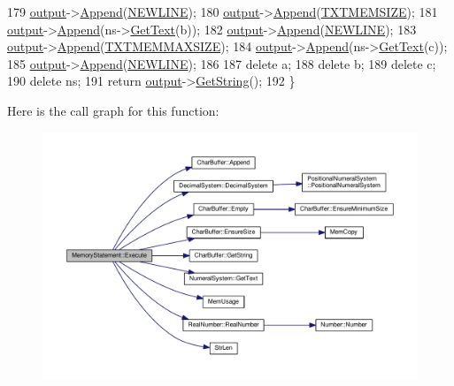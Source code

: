 \begin{DoxyCode}
179     \hyperlink{classSyntaxNode_a1180628cbe3fce43930cee0df5a9ce5c}{output}->\hyperlink{classCharBuffer_a045b38735f7b3007c1b98d3d7b7feafe}{Append}(\hyperlink{platform_8h_a806511f4930171733227c99101dc0606}{NEWLINE});
180     \hyperlink{classSyntaxNode_a1180628cbe3fce43930cee0df5a9ce5c}{output}->\hyperlink{classCharBuffer_a045b38735f7b3007c1b98d3d7b7feafe}{Append}(\hyperlink{text_8h_a6664fc01484a43ab07ff5c7ec761a637}{TXTMEMSIZE});
181     \hyperlink{classSyntaxNode_a1180628cbe3fce43930cee0df5a9ce5c}{output}->\hyperlink{classCharBuffer_a045b38735f7b3007c1b98d3d7b7feafe}{Append}(ns->\hyperlink{classNumeralSystem_a74dc91c4dbab4a88a123b2a32753f485}{GetText}(b));
182     \hyperlink{classSyntaxNode_a1180628cbe3fce43930cee0df5a9ce5c}{output}->\hyperlink{classCharBuffer_a045b38735f7b3007c1b98d3d7b7feafe}{Append}(\hyperlink{platform_8h_a806511f4930171733227c99101dc0606}{NEWLINE});
183     \hyperlink{classSyntaxNode_a1180628cbe3fce43930cee0df5a9ce5c}{output}->\hyperlink{classCharBuffer_a045b38735f7b3007c1b98d3d7b7feafe}{Append}(\hyperlink{text_8h_a9351a4edb0e5a7d13b78c016e5a964c4}{TXTMEMMAXSIZE});
184     \hyperlink{classSyntaxNode_a1180628cbe3fce43930cee0df5a9ce5c}{output}->\hyperlink{classCharBuffer_a045b38735f7b3007c1b98d3d7b7feafe}{Append}(ns->\hyperlink{classNumeralSystem_a74dc91c4dbab4a88a123b2a32753f485}{GetText}(c));
185     \hyperlink{classSyntaxNode_a1180628cbe3fce43930cee0df5a9ce5c}{output}->\hyperlink{classCharBuffer_a045b38735f7b3007c1b98d3d7b7feafe}{Append}(\hyperlink{platform_8h_a806511f4930171733227c99101dc0606}{NEWLINE});
186 
187     \textcolor{keyword}{delete} a;
188     \textcolor{keyword}{delete} b;
189     \textcolor{keyword}{delete} c;
190     \textcolor{keyword}{delete} ns;
191     \textcolor{keywordflow}{return} \hyperlink{classSyntaxNode_a1180628cbe3fce43930cee0df5a9ce5c}{output}->\hyperlink{classCharBuffer_a7dfd3feaaf80f318ba44efe15b1ec44b}{GetString}();
192 \}
\end{DoxyCode}


Here is the call graph for this function\+:\nopagebreak
\begin{figure}[H]
\begin{center}
\leavevmode
\includegraphics[width=350pt]{classMemoryStatement_a0cfd7aae34f2103c7734980907426f4e_cgraph}
\end{center}
\end{figure}




